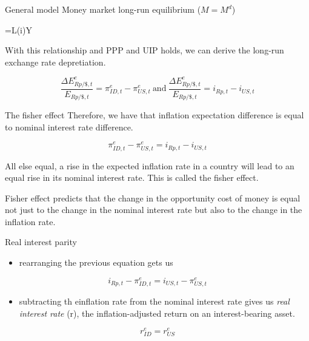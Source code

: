 \documentclass[
  ignorenonframetext,
]{beamer}
\providecommand{\tightlist}{%
  \setlength{\itemsep}{0pt}\setlength{\parskip}{0pt}}\usepackage{longtable,booktabs,array}
\begin{document}
\begin{frame}{General model}
\label{general-model-2}
Money market long-run equilibrium (\(M=M^d\))

\begin{equationn}
=L(i)Y
\end{equationn}

With this relationship and PPP and UIP holds, we can derive the long-run
exchange rate depretiation.

\begin{equation}
\frac{\Delta E^e_{Rp/\$,t}}{E_{Rp/\$,t}}=\pi^e_{ID,t}-\pi^e_{US,t} \ \text{and} \ \frac{\Delta E^e_{Rp/\$,t}}{E_{Rp/\$,t}}=i_{Rp,t}-i_{US,t}
\end{equation}
\end{frame}

\begin{frame}{The fisher effect}
\label{the-fisher-effect}
Therefore, we have that inflation expectation difference is equal to
nominal interest rate difference.

\begin{equation}
\pi^e_{ID,t}-\pi^e_{US,t} = i_{Rp,t}-i_{US,t}
\end{equation}

All else equal, a rise in the expected inflation rate in a country will
lead to an equal rise in its nominal interest rate. This is called the
fisher effect.

Fisher effect predicts that the change in the opportunity cost of money
is equal not just to the change in the nominal interest rate but also to
the change in the inflation rate.
\end{frame}

\begin{frame}{Real interest parity}
\label{real-interest-parity}
\begin{itemize}
\tightlist
\item
  rearranging the previous equation gets us
\end{itemize}

\begin{equation}
i_{Rp,t}-\pi^e_{ID,t} = i_{US,t}-\pi^e_{US,t}
\end{equation}

\begin{itemize}
\tightlist
\item
  subtracting th einflation rate from the nominal interest rate gives us
  \emph{real interest rate} (r), the inflation-adjusted return on an
  interest-bearing asset.
\end{itemize}

\begin{equation}
r^e_{ID}=r^e_{US}
\end{equation}
\end{frame}
\end{document}
